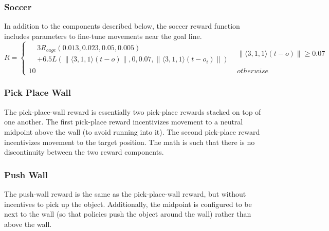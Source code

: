 {\subsubsection{Soccer}
In addition to the components described below, the soccer reward function includes parameters to fine-tune movements near the goal line.
\[R=\left\{
\begin{array}{ll}
      \begin{aligned}
      &3R_{cage}(0.013,0.023,0.05,0.005) \\
      &+ 6.5L(\lVert \langle3,1,1\rangle(t - o) \rVert, 0, 0.07, \lVert
      \langle3,1,1\rangle(t - o_i) \rVert)
      \end{aligned}
        & \lVert \langle3,1,1\rangle(t - o) \rVert\geq 0.07 \\
      10 & otherwise
\end{array} \right. \]

\subsubsection{Pick Place Wall}
The pick-place-wall reward is essentially two pick-place rewards stacked on top of one another. The first pick-place reward incentivizes movement to a neutral midpoint above the wall (to avoid running into it). The second pick-place reward incentivizes movement to the target position. The math is such that there is no discontinuity between the two reward components.

\subsubsection{Push Wall}
The push-wall reward is the same as the pick-place-wall reward, but without incentives to pick up the object. Additionally, the midpoint is configured to be next to the wall (so that policies push the object around the wall) rather than above the wall.
}


